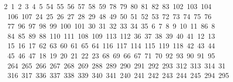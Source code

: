 \begin{tabbing}
2\ 1\ 2\ 3\ 4\ 5\ 54\ 55\ 56\ 57\ 58\ 59\ 78\ 79\ 80\ 81\ 82\ 83\ 102\ 103\ 104\ \\[0pt]
\ 106\ 107\ 24\ 25\ 26\ 27\ 28\ 29\ 48\ 49\ 50\ 51\ 52\ 53\ 72\ 73\ 74\ 75\ 76\\[0pt]
\>\ 77\ 96\ 97\ 98\ 99\ 100\ 101\ 30\ 31\ 32\ 33\ 34\ 35\ 6\ 7\ 8\ 9\ 10\ 11\ 86\ 8\\[0pt]
\ 84\ 85\ 89\ 88\ 110\ 111\ 108\ 109\ 113\ 112\ 36\ 37\ 38\ 39\ 40\ 41\ 12\ 13\ \\[0pt]
\ 15\ 16\ 17\ 62\ 63\ 60\ 61\ 65\ 64\ 116\ 117\ 114\ 115\ 119\ 118\ 42\ 43\ 44\\[0pt]
\>\ 45\ 46\ 47\ 18\ 19\ 20\ 21\ 22\ 23\ 68\ 69\ 66\ 67\ 71\ 70\ 92\ 93\ 90\ 91\ 95\ \\[0pt]
\ 264\ 265\ 266\ 267\ 268\ 269\ 288\ 289\ 290\ 291\ 292\ 293\ 312\ 313\ 314\ 31\\[0pt]
\ 316\ 317\ 336\ 337\ 338\ 339\ 340\ 341\ 240\ 241\ 242\ 243\ 244\ 245\ 294\ 295\\[0pt]

\end{tabbing}
